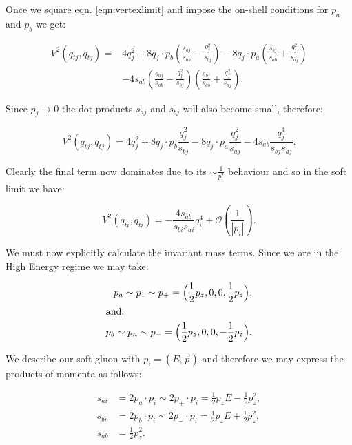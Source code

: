 			Once we square eqn. \eqref{eqn:vertexlimit} and impose the on-shell conditions for
			$p_a$ and $p_b$ we get:

			\begin{align}
				V^2(q_{tj}, q_{tj}) = &4q_j^2 + 8 q_j\cdot p_b \left(\frac{s_{aj}}{s_{ab}} - \frac{q^2_{j}}{s_{bj}}\right) -
					8q_j\cdot p_a \left(\frac{s_{bj}}{s_{ab}} + \frac{q_j^2}{s_{aj}}\right) \\ &- 4s_{ab}\left(\frac{s_{aj}}{s_{ab}} -
					\frac{q^2_{j}}{s_{bj}}\right)\left(\frac{s_{bj}}{s_{ab}} + \frac{q_j^2}{s_{aj}}\right).
			\end{align}

			Since $p_j\rightarrow0$ the dot-products $s_{aj}$ and $s_{bj}$ will also become small,
			therefore:

			\begin{equation}
				V^2(q_{tj}, q_{tj}) = 4q_j^2 + 8 q_j\cdot p_b \frac{q^2_{j}}{s_{bj}} - 8 q_j\cdot p_a \frac{q_j^2}{s_{aj}} -
					4s_{ab}\frac{q^4_{j}}{s_{bj}s_{aj}}.
			\end{equation}

			Clearly the final term now dominates due to its $\sim\frac{1}{p_i^2}$ behaviour and so
			in the soft limit we have:

			\begin{equation}
				V^2(q_{ti}, q_{ti}) = - \frac{4s_{ab}}{s_{bi}s_{ai}}q^4_{i} + \mathcal{O}\left(\frac{1}{|p_i|}\right).
				\label{eqn:temp}
			\end{equation}

			We must now explicitly calculate the invariant mass terms.  Since we are in the
			High Energy regime we may take:

			\begin{align}
				p_a\sim p_1 \sim p_+ = \Big(\frac12 p_z, 0, 0, \frac12 p_z\Big),\\
				\intertext{and,}
				p_b\sim p_n \sim p_- = \Big(\frac12 p_z, 0, 0, -\frac12 p_z\Big).
			\end{align}

			We describe our soft gluon with $p_i=(E, \vec{p})$ and therefore we may express the
			products of momenta as follows:

			\begin{align}
				s_{ai} &= 2p_a\cdot p_i\sim2p_+\cdot p_i = \frac12p_zE - \frac12p_z^2,\\
				s_{bi} &= 2p_b\cdot p_i\sim2p_-\cdot p_i = \frac12p_zE + \frac12p_z^2,\\
				s_{ab} &= \frac12p_z^2.
			\end{align}

